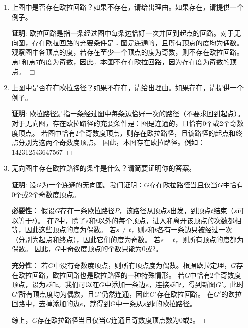 \documentclass[11pt]{article}
\newenvironment{qparts}{\begin{enumerate}[{(}a{)}]}{\end{enumerate}}
\def\endproofmark{$\Box$}
\newenvironment{proof}{\par{\bf 证明}:}{\endproofmark\smallskip}
\begin{document}
\begin{qparts}
\item 上图中是否存在欧拉回路？如果不存在，请给出理由。如果存在，请提供一个例子。

\begin{proof}
欧拉回路是指一条经过图中每条边恰好一次并回到起点的回路。对于无向图，存在欧拉回路的充要条件是：图是连通的，且所有顶点的度均为偶数。\newline
观察图中各顶点的度，若存在至少一个顶点的度为奇数，则不存在欧拉回路。\newline
点1和点7的度为奇数，因此，本图不存在欧拉回路，因为存在度为奇数的顶点。
\end{proof}

\item 上图中是否存在欧拉路径？如果不存在，请给出理由。如果存在，请提供一个例子。

\begin{proof}
欧拉路径是指一条经过图中每条边恰好一次的路径（不要求回到起点）。对于无向图，存在欧拉路径的充要条件是：图是连通的，且恰有0个或2个奇数度顶点。\newline
若图中恰有2个奇数度顶点，则存在欧拉路径，且该路径的起点和终点分别为这两个奇数度顶点。\newline
因此，本图存在欧拉路径。例如：142312543647567
\end{proof}

\item 无向图中存在欧拉路径的条件是什么？请简要证明你的答案。

\begin{proof}
设$G$为一个连通的无向图。我们证明：$G$存在欧拉路径当且仅当$G$中恰有0个或2个奇数度顶点。

\textbf{必要性}：
假设$G$存在一条欧拉路径$P$，该路径从顶点$s$出发，到顶点$t$结束（$s$可以等于$t$）。
在$P$中，除了$s$和$t$以外的每个顶点，进入和离开该顶点的次数都相等，因此这些顶点的度为偶数。
若$s \neq t$，则$s$和$t$各有一条边只被经过一次（分别为起点和终点），因此它们的度为奇数。
若$s = t$，则所有顶点的度都为偶数。
因此，$G$中奇数度顶点的个数只能为0或2。

\textbf{充分性}：
若$G$中没有奇数度顶点，则所有顶点度为偶数。根据欧拉定理，$G$存在欧拉回路，欧拉回路也是欧拉路径的一种特殊情形。
若$G$中恰有2个奇数度顶点，设为$s$和$t$。我们可以在$G$中添加一条边$e$，连接$s$和$t$，得到新图$G'$。此时$G'$所有顶点度均为偶数，且$G'$仍然连通，因此$G'$存在欧拉回路。
在$G'$的欧拉回路中，去掉添加的边$e$，就得到$G$中一条从$s$到$t$的欧拉路径。

综上，$G$存在欧拉路径当且仅当$G$连通且奇数度顶点数为0或2。
\end{proof}

\end{qparts}
\end{document}
